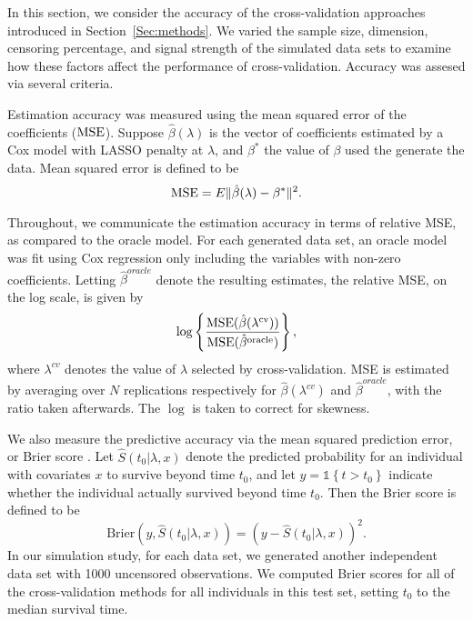 In this section, we consider the accuracy of the cross-validation approaches introduced in Section~\ref{Sec:methods}. We varied the sample size, dimension, censoring percentage, and signal strength of the simulated data sets to examine how these factors affect the performance of cross-validation. Accuracy was assesed via several criteria.

Estimation accuracy was measured using the mean squared error of the coefficients ($\textrm{MSE}$). Suppose $\hat{\beta}(\lambda)$ is the vector of coefficients estimated by a Cox model with LASSO penalty at $\lambda$, and $\beta^*$ the value of $\beta$ used the generate the data. Mean squared error is defined to be 
\begin{equation}
\textrm{MSE} = E\| \hat{\beta}(\lambda) - \beta^* \| ^2.
\end{equation}

Throughout, we communicate the estimation accuracy in terms of relative MSE, as compared to the oracle model.  For each generated data set, an oracle model was fit using Cox regression only including the variables with non-zero coefficients. Letting $\hat{\beta}^{oracle}$ denote the resulting estimates, the relative MSE, on the log scale, is given by
\begin{equation}
\log\left\{ \frac{\textrm{MSE}(\hat{\beta}(\lambda^{\text{cv}}))}{\textrm{MSE}(\hat{\beta}^{\text{oracle}})} \right\},
\end{equation}
where $\lambda^{cv}$ denotes the value of $\lambda$ selected by cross-validation. MSE is estimated by averaging over $N$ replications respectively for $\hat{\beta}(\lambda^{cv})$ and $\hat{\beta}^{oracle}$, with the ratio taken afterwards. The $\log$ is taken to correct for skewness.

\par We also measure the predictive accuracy via the mean squared prediction error, or Brier score \citep{VanHouwelingen2011}. Let $\hat{S}(t_0|\lambda,x)$ denote the predicted probability for an individual with covariates $x$ to survive beyond time $t_0$, and let $y = \mathbb{1}\left\{ t > t_{0}\right\}$ indicate whether the individual actually survived beyond time $t_0$. Then the Brier score is defined to be
\begin{equation}
\text{Brier}(y, \hat{S}(t_0|\lambda,x)) = (y - \hat{S}(t_0|\lambda,x))^2.
\end{equation}
In our simulation study, for each data set, we generated another independent data set with 1000 uncensored observations. We computed Brier scores for all of the cross-validation methods for all individuals in this test set, setting $t_0$ to the median survival time.

